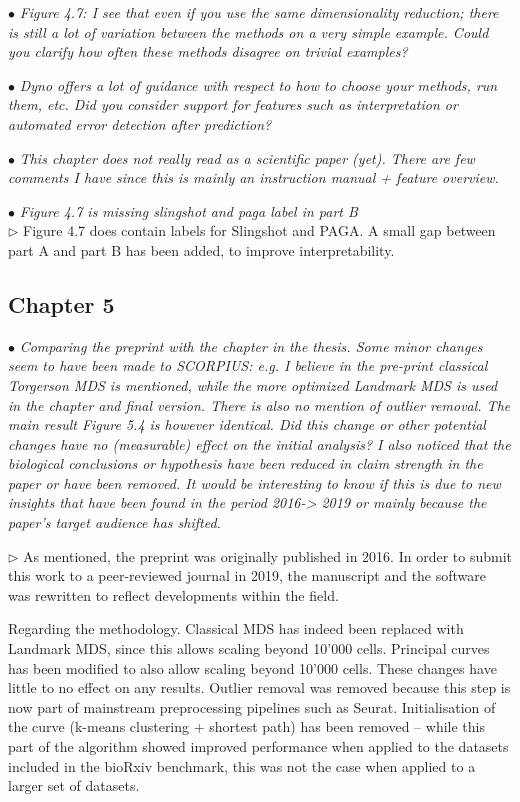 \documentclass[10pt]{article}
\newcommand{\exam}[2][\  ]{\hspace{0pt}\marginpar{\color{red}#1}$\bullet$ \textit{#2}}
\newcommand{\imp}[1]{{\color{red} #1}}
\newcommand{\answ}[1]{{\color{blue} $\triangleright$ #1}}
\newcommand{\bigexclaim}{\raisebox{-0.1em}{\BigTriangleUp}\hspace{-0.32em}\llap{\small\textbf{!}}\hspace{0.32em}}
\newcommand{\tagimp}{\bigexclaim}
\newcommand{\tagtime}{{\Large $\hourglass$}}
\begin{document}
{\exam{Figure 4.7: I see that even if you use the same dimensionality
	reduction; there is still a lot of variation between the methods on a very simple
	example. Could you clarify
	how often these methods disagree on trivial examples?}

\exam{Dyno offers a lot of
	guidance with respect to how to choose your methods, run them, etc. Did you
	consider support for features such as interpretation or automated error
	detection after prediction?}


\exam[\tagimp \tagtime]{\imp{This chapter does not really read as a scientific paper (yet).} There are few
	comments I have since this is mainly an instruction manual + feature overview.}



\exam{Figure 4.7 is missing slingshot and paga label in part B} \\
\answ{Figure 4.7 does contain labels for Slingshot and PAGA. A small gap between part A and part B has been added, to improve interpretability.}


\subsection{Chapter 5}

\exam[\tagimp]{Comparing the preprint with the chapter in the thesis. Some minor changes
	seem to have been made to SCORPIUS: e.g. I believe in the pre-print
	classical Torgerson MDS is mentioned, while the more optimized Landmark
	MDS is used in the chapter and final version. There is also no mention of
	outlier removal. The main result Figure 5.4 is however identical. \imp{Did this
	change or other potential changes have no (measurable) effect on the initial
	analysis? I also noticed that the biological conclusions or hypothesis have
	been reduced in claim strength in the paper or have been removed.} It would
	be interesting to know if this is due to new insights that have been found in the
	period 2016-> 2019 or mainly because the paper’s target audience has
	shifted.} \\

\answ{As mentioned, the preprint was originally published in 2016. In order to submit this work to a peer-reviewed journal in 2019, the manuscript and the software was rewritten to reflect developments within the field.

Regarding the methodology. Classical MDS has indeed been replaced with Landmark MDS, since this allows scaling beyond 10'000 cells. Principal curves has been modified to also allow scaling beyond 10'000 cells. These changes have little to no effect on any results. Outlier removal was removed because this step is now part of mainstream preprocessing pipelines such as Seurat. Initialisation of the curve (k-means clustering + shortest path) has been removed -- while this part of the algorithm showed improved performance when applied to the datasets included in the bioRxiv benchmark, this was not the case when applied to a larger set of datasets. 

}}
\end{document}
